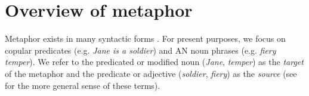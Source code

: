 \documentclass[9pt,twocolumn,twoside,lineno]{pnas-new}
\begin{document}









\section{Overview of metaphor}

	Metaphor exists in many syntactic forms \cite{black1954metaphor}.
	For present purposes, we focus on copular predicates (e.g. \emph{Jane is a soldier}) and AN noun phrases (e.g. \emph{fiery temper}). We refer to the predicated or modified noun (\emph{Jane}, \emph{temper}) as the \emph{target} of the metaphor and the predicate or adjective (\emph{soldier}, \emph{fiery}) as the \emph{source} (see \cite{lakoff1980metaphors} for the more general sense of these terms).

\end{document}
